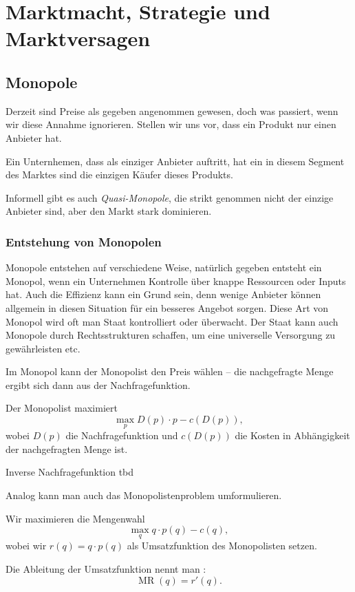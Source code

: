 \chapter{Marktmacht, Strategie und Marktversagen}


\section{Monopole}

Derzeit sind Preise als gegeben angenommen gewesen, doch was passiert, wenn wir diese Annahme ignorieren.
Stellen wir uns vor, dass ein Produkt nur einen Anbieter hat.


\begin{definition}[Monopol]
	Ein Unternhemen, dass als einziger Anbieter auftritt, hat ein  in diesem Segment des Marktes
	 sind die einzigen Käufer dieses Produkts.
\end{definition}

Informell gibt es auch \emph{Quasi-Monopole}, die strikt genommen nicht der einzige Anbieter sind,
aber den Markt stark dominieren.

\subsection{Entstehung von Monopolen}

Monopole entstehen auf verschiedene Weise, natürlich gegeben entsteht ein Monopol, wenn ein Unternehmen Kontrolle über knappe Ressourcen oder Inputs hat.
Auch die Effizienz kann ein Grund sein, denn wenige Anbieter können allgemein in diesen Situation für ein besseres Angebot sorgen.
Diese Art von Monopol wird oft man Staat kontrolliert oder überwacht.
Der Staat kann auch Monopole durch Rechtsstrukturen schaffen, um eine universelle Versorgung zu gewährleisten etc.


Im Monopol kann der Monopolist den Preis wählen – die nachgefragte
Menge ergibt sich dann aus der Nachfragefunktion.
\begin{construction}
	Der Monopolist maximiert
	\[
		\max_p D(p) \cdot p - c(D(p))
		,\]
	wobei $D(p)$ die Nachfragefunktion und $c(D(p))$ die Kosten in Abhängigkeit der nachgefragten Menge ist.
\end{construction}


Inverse Nachfragefunktion tbd


Analog kann man auch das Monopolistenproblem umformulieren.

\begin{construction}
	Wir maximieren die Mengenwahl
	\[
		\max_q q \cdot p(q) - c(q)
		,\]
	wobei wir $r(q) = q \cdot p(q)$ als Umsatzfunktion des Monopolisten setzen.
\end{construction}

\begin{definition}
	Die Ableitung der Umsatzfunktion nennt man :
	\[
		\operatorname{MR}(q)  = r'(q)
		.\]
\end{definition}
